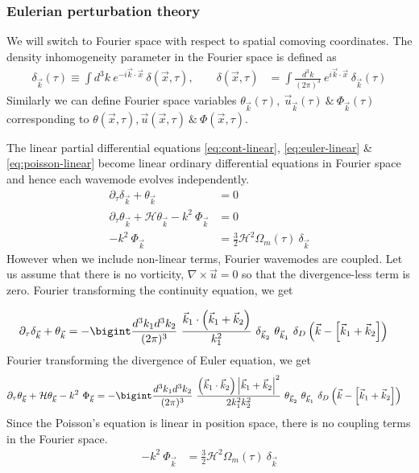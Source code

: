 \documentclass[12pt]{article}
\begin{document}
\subsubsection{Eulerian perturbation theory}
\label{eulerian-pt}
We will switch to Fourier space with respect to spatial comoving coordinates. The density inhomogeneity parameter in the Fourier space is defined as
\begin{align}
\delta_{\vec{k}}(\tau) \equiv \int d^3k ~e^{-i \vec{k} \cdot \vec{x}} ~\delta(\vec{x},\tau), \qquad
\delta (\vec{x},\tau) &= \int \frac{d^3k}{(2\pi)^3} ~e^{i \vec{k} \cdot \vec{x}} ~\delta_{\vec{k}}(\tau)
\end{align}
Similarly we can define Fourier space variables $\theta_{\vec{k}}(\tau), ~\vec{u}_{\vec{k}}(\tau) ~\&~ \Phi_{\vec{k}}(\tau)$ corresponding to $\theta (\vec{x},\tau), \vec{u} (\vec{x},\tau) ~\&~ \Phi (\vec{x},\tau)$.

The linear partial differential equations \eqref{eq:cont-linear}, \eqref{eq:euler-linear} \& \eqref{eq:poisson-linear} become linear ordinary differential equations in Fourier space and hence each wavemode evolves independently.
\begin{align}
\partial_{\tau} \delta_{\vec{k}} + \theta_{\vec{k}} &= 0\\
\partial_{\tau} \theta_{\vec{k}} + \mathcal{H} \theta_{\vec{k}} - k^2 ~\Phi_{\vec{k}} &= 0\\
-k^2 ~\Phi_{\vec{k}} &= \frac{3}{2} \mathcal{H}^2 \Omega_{m}(\tau) ~\delta_{\vec{k}}
\end{align}
However when we include non-linear terms, Fourier wavemodes are coupled. Let us assume that there is no vorticity, $\nabla \times \vec{u} = 0$ so that the divergence-less term is zero.  Fourier transforming the continuity equation, we get

\begin{align}
\label{eq:cont-eqn-fourier}
\partial_{\tau} \delta_{\vec{k}} + \theta_{\vec{k}} &= - \bigint \frac{d^3k_1 d^3k_2} { (2 \pi)^3} ~\frac{\vec{k}_1 \cdot \left( \vec{k}_1 + \vec{k}_2 \right) }{k_1^2}  ~\delta_{\vec{k}_2} ~\theta_{\vec{k}_1} ~\delta_D \left( \vec{k} - \left[ \vec{k}_1 + \vec{k}_2 \right] \right)
\end{align}
Fourier transforming the divergence of Euler equation, we get
\begin{align}
\label{eq:euler-eqn-fourier}
\partial_{\tau} \theta_{\vec{k}} + \mathcal{H} \theta_{\vec{k}} - k^2 ~\Phi_{\vec{k}} &= - \bigint \frac{d^3k_1 d^3k_2} { (2 \pi)^3} ~\frac{\left( \vec{k}_1 \cdot \vec{k}_2 \right) \left| \vec{k}_1 + \vec{k}_2 \right|^2 }{2 k_1^2 k_2^2}  ~\theta_{\vec{k}_2} ~\theta_{\vec{k}_1} ~\delta_D \left( \vec{k} - \left[ \vec{k}_1 + \vec{k}_2 \right] \right)
\end{align}
Since the Poisson's equation is linear in position space, there is no coupling terms in the Fourier space.
\begin{align}
-k^2 ~\Phi_{\vec{k}} &= \frac{3}{2} \mathcal{H}^2 \Omega_{m}(\tau) ~\delta_{\vec{k}}
\end{align}
\end{document}
